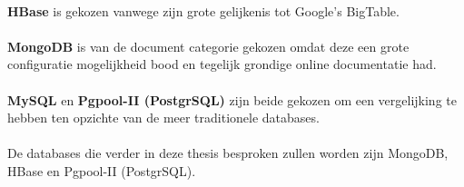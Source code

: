 \paragraph{} \textbf{HBase} is gekozen vanwege zijn grote gelijkenis tot Google's BigTable.

\paragraph{} \textbf{MongoDB} is van de document categorie gekozen omdat deze een grote configuratie mogelijkheid bood en tegelijk grondige online documentatie had. 

\paragraph{} \textbf{MySQL} en \textbf{Pgpool-II (PostgrSQL)} zijn beide gekozen om een vergelijking te hebben ten opzichte van de meer traditionele databases. 

\paragraph{} De databases die verder in deze thesis besproken zullen worden zijn MongoDB, HBase en Pgpool-II (PostgrSQL). 

